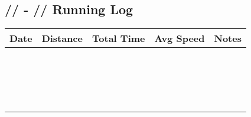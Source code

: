 \documentclass{article}
\begin{document}
\begin{center}

\section*{\hspace{.5cm}/\hspace{.5cm}/\hspace{.5cm} - \hspace{.5cm}/\hspace{.5cm}/\hspace{.5cm} Running Log}

{\setlength{\extrarowheight}{15pt}%
    \begin{tabularx}{\textwidth}{|X|X|X|X|X|}
        \hline
        Date & Distance & Total Time & Avg Speed & Notes\\
        \hline\hline
        & & & & \\
        \hline
        & & & & \\
        \hline
        & & & & \\
        \hline
        & & & & \\
        \hline
        & & & & \\
        \hline
        & & & & \\
        \hline
        & & & & \\
        \hline
        & & & & \\
        \hline
        & & & & \\
        \hline
        & & & & \\
        \hline
        & & & & \\
        \hline
        & & & & \\
        \hline
        & & & & \\
        \hline
        & & & & \\
        \hline
        & & & & \\
        \hline
        & & & & \\
        \hline
        & & & & \\
        \hline
        & & & & \\
        \hline
    \end{tabularx}}
\end{center}
\end{document}
